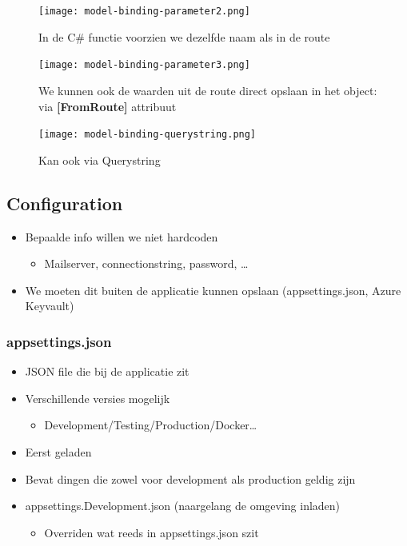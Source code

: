 \documentclass{article}
\begin{document}
\begin{figure}[H]
    \centering
    \texttt{[image: model-binding-parameter2.png]}
    \caption{In de C\# functie voorzien we dezelfde naam als in de route}
\end{figure}

\begin{figure}[H]
    \centering
    \texttt{[image: model-binding-parameter3.png]}
    \caption{We kunnen ook de waarden uit de route direct opslaan in het object: via \textbf{[FromRoute]} attribuut}
\end{figure}

\begin{figure}[H]
    \centering
    \texttt{[image: model-binding-querystring.png]}
    \caption{Kan ook via Querystring}
\end{figure}

\subsection{Configuration}

\begin{itemize}
    \item Bepaalde info willen we niet hardcoden
    \begin{itemize}
        \item Mailserver, connectionstring, password, \dots
    \end{itemize}
    \item We moeten dit buiten de applicatie kunnen opslaan (appsettings.json, Azure Keyvault)
\end{itemize}

\subsubsection{appsettings.json}

\begin{itemize}
    \item JSON file die bij de applicatie zit
    \item Verschillende versies mogelijk
    \begin{itemize}
        \item Development/Testing/Production/Docker\dots
    \end{itemize}
    \item Eerst geladen
    \item Bevat dingen die zowel voor development als production geldig zijn
    \item appsettings.Development.json (naargelang de omgeving inladen)
    \begin{itemize}
        \item Overriden wat reeds in appsettings.json szit
    \end{itemize}
\end{itemize}
\end{document}
